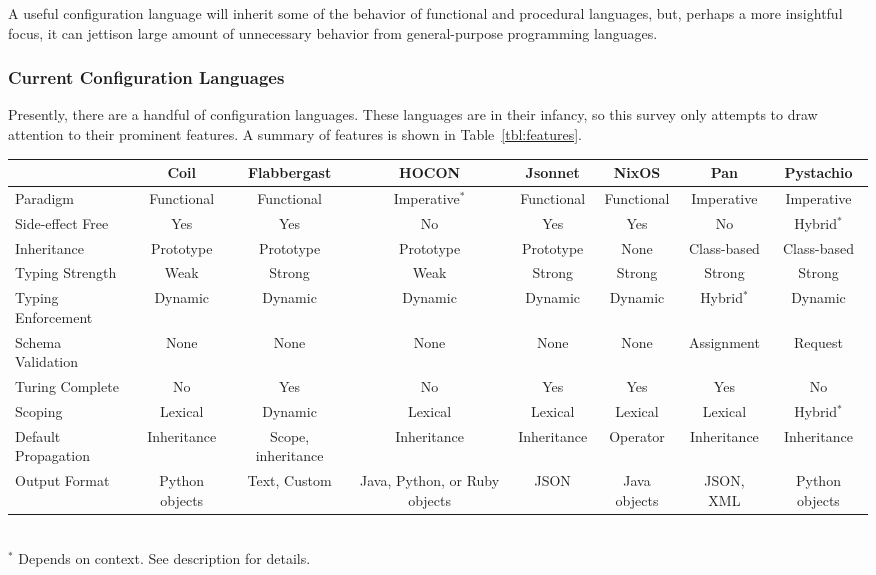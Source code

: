 \documentclass[letterpaper,twocolumn,10pt]{article}
\begin{document}
A useful configuration language will inherit some of the behavior of functional and procedural languages, but, perhaps a more insightful focus, it can jettison large amount of unnecessary behavior from general-purpose programming languages.

\subsubsection{Current Configuration Languages}
Presently, there are a handful of configuration languages. These languages are in their infancy, so this survey only attempts to draw attention to their prominent features. A summary of features is shown in Table~\ref{tbl:features}.

\begin{table*}
\caption{\label{tbl:features}Comparison of configuration languages}
\scriptsize
\begin{tabular}{lccccccc}
\hline
										& Coil						& Flabbergast					& HOCON					& Jsonnet			& NixOS				& Pan & Pystachio \\\hline
Paradigm						& Functional			& Functional					& Imperative$^*$&	Functional	& Functional	& Imperative			& Imperative \\
Side-effect Free		& Yes							& Yes									& No						&	Yes					& Yes					& No							& Hybrid$^*$ \\
Inheritance					& Prototype				& Prototype						& Prototype			&	Prototype		& None				& Class-based			& Class-based \\
Typing Strength			& Weak						& Strong							& Weak					&	Strong			& Strong			& Strong					& Strong \\
Typing Enforcement	& Dynamic					& Dynamic							&	Dynamic				&	Dynamic			& Dynamic			& Hybrid$^*$			& Dynamic \\
Schema Validation		& None						& None								& None					& None				& None				& Assignment			& Request \\
Turing Complete			& No							& Yes									& No						& Yes					& Yes					& Yes							& No \\
Scoping							& Lexical					& Dynamic							& Lexical				& Lexical			& Lexical			& Lexical					& Hybrid$^*$ \\
Default Propagation	& Inheritance			&	Scope, inheritance	& Inheritance		& Inheritance	& Operator		& Inheritance			& Inheritance \\
Output Format				& Python objects	&	Text, Custom				& Java, Python, or Ruby objects		& JSON				& Java objects			& JSON, XML				& Python objects \\
\hline
\end{tabular}\\
$^*$ Depends on context. See description for details.
\end{table*}
\end{document}
